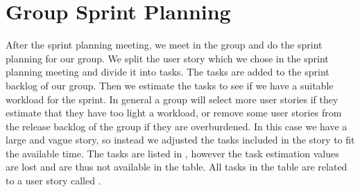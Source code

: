 \section{Group Sprint Planning}\label{sec:group_sprint_planning}
After the \bd sprint planning meeting, we meet in the group and do the sprint planning for our group. We split the user story which we chose in the \bd sprint planning meeting and divide it into tasks. The tasks are added to the sprint backlog of our group. Then we estimate the tasks to see if we have a suitable workload for the sprint. In general a group will select more user stories if they estimate that they have too light a workload, or remove some user stories from the release backlog of the group if they are overburdened. In this case we have a large and vague story, so instead we adjusted the tasks included in the story to fit the available time. The tasks are listed in , however the task estimation values are lost and are thus not available in the table. All tasks in the table are related to a user story called .

